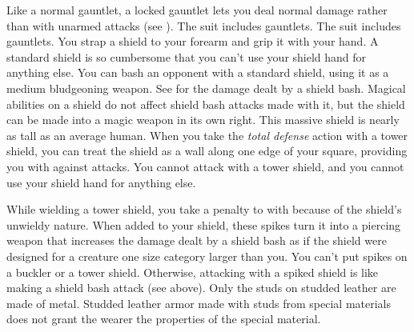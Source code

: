         Like a normal gauntlet, a locked gauntlet lets you deal normal damage rather than  with unarmed attacks (see ).
         The suit includes gauntlets.
         The suit includes gauntlets.
         You strap a shield to your forearm and grip it with your hand. A standard shield is so cumbersome that you can't use your shield hand for anything else.
         You can bash an opponent with a standard shield, using it as a medium bludgeoning weapon. See  for the damage dealt by a shield bash.
        Magical abilities on a shield do not affect shield bash attacks made with it, but the shield can be made into a magic weapon in its own right.
         This massive shield is nearly as tall as an average human.
        When you take the \textit{total defense} action with a tower shield, you can treat the shield as a wall along one edge of your square, providing you with  against attacks.
        You cannot attack with a tower shield, and you cannot use your shield hand for anything else.

        While wielding a tower shield, you take a  penalty to  with  because of the shield's unwieldy nature.
         When added to your shield, these spikes turn it into a piercing weapon that increases the damage dealt by a shield bash as if the shield were designed for a creature one size category larger than you. You can't put spikes on a buckler or a tower shield. Otherwise, attacking with a spiked shield is like making a shield bash attack (see above).
         Only the studs on studded leather are made of metal.
        Studded leather armor made with studs from special materials does not grant the wearer the properties of the special material.

